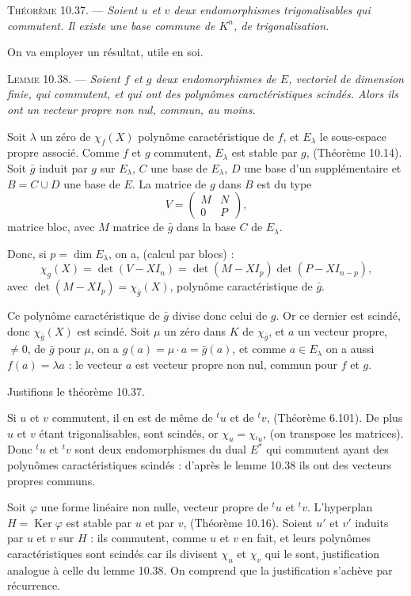 \medskip\noindent\textsc{Théorème 10.37.} --- \emph{Soient $u$ et $v$ deux endomorphismes trigonalisables qui commutent. Il existe une base commune de $K^n$, de trigonalisation.}

On va employer un résultat, utile en soi.

\medskip\noindent\textsc{Lemme 10.38.} --- \emph{Soient $f$ et $g$ deux endomorphismes de $E$, vectoriel de dimension finie, qui commutent, et qui ont des polynômes caractéristiques scindés. Alors ils ont un vecteur propre non nul, commun, au moins.}

Soit $\lambda$ un zéro de $\chi_f(X)$ polynôme caractéristique de $f$, et $E_\lambda$ le sous-espace propre associé. Comme $f$ et $g$ commutent, $E_\lambda$ est stable par $g$, (Théorème 10.14). Soit $\bar g$ induit par $g$ sur $E_\lambda$, $C$ une base de $E_\lambda$, $D$ une base d'un supplémentaire et $B=C\cup D$ une base de $E$. La matrice de $g$ dans $B$ est du type
\[
V=\begin{pmatrix}M&N\\0&P\end{pmatrix},
\]
matrice bloc, avec $M$ matrice de $\bar g$ dans la base $C$ de $E_\lambda$.

Donc, si $p=\dim E_\lambda$, on a, (calcul par blocs) :
\[
\chi_g(X)=\det(V-XI_n)=\det(M-XI_p)\det(P-XI_{n-p}),
\]
avec $\det(M-XI_p)=\chi_{\bar g}(X)$, polynôme caractéristique de $\bar g$.

Ce polynôme caractéristique de $\bar g$ divise donc celui de $g$. Or ce dernier est scindé, donc $\chi_{\bar g}(X)$ est scindé. Soit $\mu$ un zéro dans $K$ de $\chi_{\bar g}$, et $a$ un vecteur propre, $\ne0$, de $\bar g$ pour $\mu$, on a $g(a)=\mu\cdot a=\bar g(a)$, et comme $a\in E_\lambda$ on a aussi $f(a)=\lambda a$ : le vecteur $a$ est vecteur propre non nul, commun pour $f$ et $g$. \bookend

Justifions le théorème 10.37.

Si $u$ et $v$ commutent, il en est de même de ${}^tu$ et de ${}^tv$, (Théorème 6.101). De plus $u$ et $v$ étant trigonalisables,  sont scindés, or $\chi_u=\chi_{{}^tu}$, (on transpose les matrices). Donc ${}^tu$ et ${}^tv$ sont deux endomorphismes du dual $E^*$ qui commutent ayant des polynômes caractéristiques scindés : d'après le lemme 10.38 ils ont des vecteurs propres communs.

Soit $\varphi$ une forme linéaire non nulle, vecteur propre de ${}^tu$ et ${}^tv$. L'hyperplan $H=\operatorname{Ker}\varphi$ est stable par $u$ et par $v$, (Théorème 10.16). Soient $u'$ et $v'$ induits par $u$ et $v$ sur $H$ : ils commutent, comme $u$ et $v$ en fait, et leurs polynômes caractéristiques sont scindés car ils divisent $\chi_u$ et $\chi_v$ qui le sont, justification analogue à celle du lemme 10.38. On comprend que la justification s'achève par récurrence.

